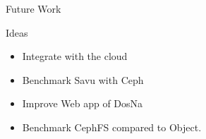 \begin{frame}{Future Work}
    \begin{block}{Ideas}
    \begin{itemize}
        \item Integrate with the cloud
        \item Benchmark Savu with Ceph
        \item Improve Web app of DosNa
        \item Benchmark CephFS compared to Object. 
    \end{itemize}
    \end{block}
\end{frame}